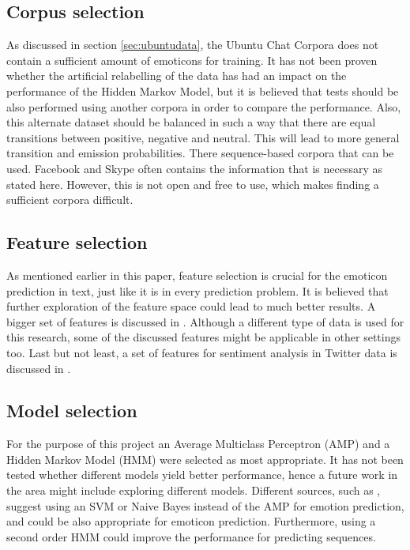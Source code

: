 \subsection{Corpus selection}
As discussed in section \ref{sec:ubuntudata}, the Ubuntu Chat Corpora does not contain a sufficient amount of emoticons for training. It has not been proven whether the artificial relabelling of the data has had an impact on the performance of the Hidden Markov Model, but it is believed that tests should be also performed using another corpora in order to compare the performance. Also, this alternate dataset should be balanced in such a way that there are equal transitions between positive, negative and neutral. This will lead to more general transition and emission probabilities. There sequence-based corpora that can be used. Facebook and Skype often contains the information that is necessary as stated here. However, this is not open and free to use, which makes finding a sufficient corpora difficult. %

\subsection{Feature selection}

As mentioned earlier in this paper, feature selection is crucial for the emoticon prediction in text, just like it is in every prediction problem. It is believed that further exploration of the feature space could lead to much better results. A bigger set of features is discussed in \cite{fairytales}. Although a different type of data is used for this research, some of the discussed features might be applicable in other settings too. Last but not least, a set of features for sentiment analysis in Twitter data is discussed in \cite{twittersentiment}.

\subsection{Model selection}

For the purpose of this project an Average Multiclass Perceptron (AMP) and a Hidden Markov Model (HMM) were selected as most appropriate. It has not been tested whether different models yield better performance, hence a future work in the area might include exploring different models. Different sources, such as \cite{emotionclassifiers}, suggest using an SVM or Naive Bayes instead of the AMP for emotion prediction, and could be also appropriate for emoticon prediction. Furthermore, using a second order HMM could improve the performance for predicting sequences.

